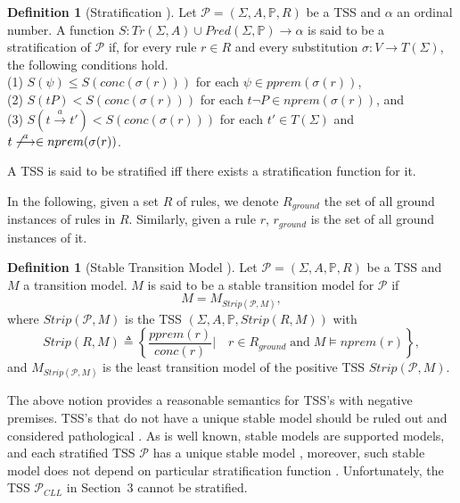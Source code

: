 \documentclass{elsarticle}
\theoremstyle{plain}
\theoremstyle{definition}
\newtheorem{mydefn}[theorem]{Definition}
\begin{document}
\begin{mydefn}[Stratification \cite{Aceto01,Bol96}]\label{D:STRATIFICATION}
     Let $\mathcal{P}=(\Sigma,A,\mathbb{P},R)$ be a TSS and $\alpha$ an ordinal number. A function $S:Tr(\Sigma,A)\cup Pred(\Sigma, \mathbb{P}) \longrightarrow \alpha$ is said to be a stratification of $\mathcal{P}$ if, for every rule $r \in R$ and every substitution $\sigma :V \longrightarrow T(\Sigma)$, the following conditions hold.\\
    (1) $S(\psi)\leq S(conc( \sigma(r)))$ for each $\psi \in pprem(\sigma (r))$,\\
    (2) $S(tP)<S(conc(\sigma(r)))$ for each $t \neg P \in nprem(\sigma(r))$, and\\
    (3) $S(t \stackrel{a}{\longrightarrow} t') < S(conc(\sigma(r)))$ for each $t' \in T(\Sigma)$ and $t \not\stackrel{a}{\longrightarrow} \in nprem(\sigma(r))$.

    A TSS is said to be stratified iff there exists a stratification function for it.
\end{mydefn}

In the following, given a set $R$ of rules, we denote $R_{ground}$ the set of all ground instances of rules in $R$. Similarly, given a rule $r$, $r_{ground}$ is the set of all ground instances of it.

\begin{mydefn}[Stable Transition Model  \cite{Bol96,Gelfond88}]\label{D:STABLE}
    Let $\mathcal{P}=(\Sigma,A,\mathbb{P},R)$ be a TSS and $M$ a transition model. $M$ is said to be a stable transition model for $\mathcal P$ if
    \[M=M_{Strip({\mathcal P},M)},\]
    where
    $Strip({\mathcal P},M)$ is the TSS $(\Sigma,A,\mathbb{P},Strip(R,M))$ with
    \[Strip(R,M)\triangleq\left\{\frac{pprem(r)}{conc(r)}|\quad r\in R_{ground}\;\text{and}\;M\models nprem(r)\right\},
    \]
    and $M_{Strip({\mathcal P},M)}$ is the least transition model of the positive TSS $Strip({\mathcal P},M)$.
\end{mydefn}

The above notion provides a reasonable semantics for TSS's with negative premises.
TSS's that do not have a unique stable model should be ruled out and considered pathological \cite{Bol96}.
As is well known, stable models are supported models, and each stratified TSS $\mathcal P$ has a unique stable model \cite{Bol96}, moreover, such stable model does not depend on particular stratification function \cite{Groote93}. Unfortunately, the TSS ${\mathcal P}_{CLL}$ in Section~3 cannot be stratified.
\end{document}
